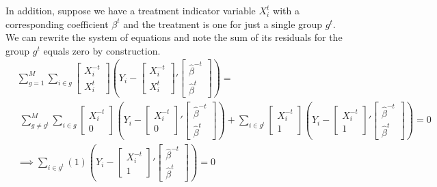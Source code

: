 \documentclass[12pt]{article}
\begin{document}
In addition, suppose we have a treatment indicator variable $X_i^t$ with a corresponding coefficient $\beta^t$ and the treatment is one for just a single group $g^t$. We can rewrite the system of equations and note the sum of its residuals for the group $g^t$ equals zero by construction. 
\begin{align*}
& \sum_{g=1}^{M} \sum_{i \in g} \begin{bmatrix}
X_i^{-t} \\  X_i^t 
\end{bmatrix}(Y_i - \begin{bmatrix}
X_i^{-t} \\  X_i^t 
\end{bmatrix}' \begin{bmatrix}
\hat{\beta}^{-t} \\ \hat{\beta}^t 
\end{bmatrix}) = \\  & \; \sum_{g\ne g^t}^{M} \sum_{i \in g} \begin{bmatrix}
X_i^{-t} \\  0 
\end{bmatrix}(Y_i - \begin{bmatrix}
X_i^{-t} \\  0 
\end{bmatrix}' \begin{bmatrix}
\hat{\beta}^{-t} \\ \hat{\beta}^t 
\end{bmatrix}) + \sum_{i \in g^t} \begin{bmatrix}
X_i^{-t} \\  1 
\end{bmatrix}(Y_i - \begin{bmatrix}
X_i^{-t} \\  1 
\end{bmatrix}' \begin{bmatrix}
\hat{\beta}^{-t} \\ \hat{\beta}^t 
\end{bmatrix}) = 0 \\
& \implies \sum_{i \in g^t} (1) 
(Y_i - \begin{bmatrix}
X_i^{-t} \\  1 
\end{bmatrix}' \begin{bmatrix}
\hat{\beta}^{-t} \\ \hat{\beta}^t 
\end{bmatrix}) = 0
\end{align*}
\end{document}
